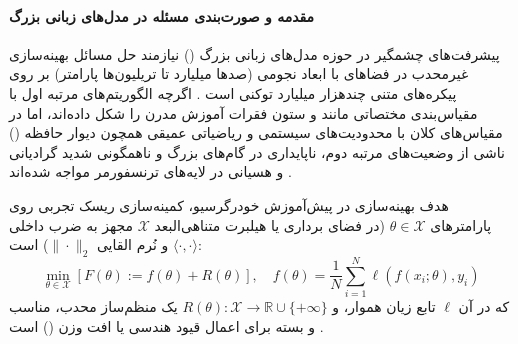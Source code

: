 \item {}

\paragraph*{مقدمه و صورت‌بندی مسئله در مدل‌های زبانی بزرگ}
پیشرفت‌های چشمگیر در حوزه مدل‌های زبانی بزرگ () نیازمند حل مسائل بهینه‌سازی غیرمحدب در فضاهای با ابعاد نجومی (صدها میلیارد تا تریلیون‌ها پارامتر) بر روی پیکره‌های متنی چندهزار میلیارد توکنی است \cite{gan2026beyond}. اگرچه الگوریتم‌های مرتبه اول با مقیاس‌بندی مختصاتی مانند  \cite{kingma2015adam} و  \cite{loshchilov2019decoupled} ستون فقرات آموزش مدرن را شکل داده‌اند، اما در مقیاس‌های کلان با محدودیت‌های سیستمی و ریاضیاتی عمیقی همچون دیوار حافظه () ناشی از وضعیت‌های مرتبه دوم، ناپایداری در گام‌های بزرگ و ناهمگونی شدید گرادیانی و هسیانی در لایه‌های ترنسفورمر مواجه شده‌اند \cite{zhang2026evolution, tomihari2026understanding}. 

هدف بهینه‌سازی در پیش‌آموزش خودرگرسیو، کمینه‌سازی ریسک تجربی روی پارامترهای $\theta \in \mathcal{X}$ (در فضای برداری یا هیلبرت متناهی‌البعد $\mathcal{X}$ مجهز به ضرب داخلی $\langle \cdot, \cdot \rangle$ و نُرم القایی $\|\cdot\|_2$) است:
\begin{equation}
    \min_{\theta \in \mathcal{X}} \left[ F(\theta) := f(\theta) + R(\theta) \right], \quad f(\theta) = \frac{1}{N} \sum_{i=1}^N \ell(f(x_i; \theta), y_i)
\end{equation}
که در آن $\ell$ تابع زیان هموار، و $R(\theta): \mathcal{X} \to \mathbb{R} \cup \{+\infty\}$ یک منظم‌ساز محدب، مناسب و بسته برای اعمال قیود هندسی یا افت وزن () است \cite{kovalev2025understanding}.


